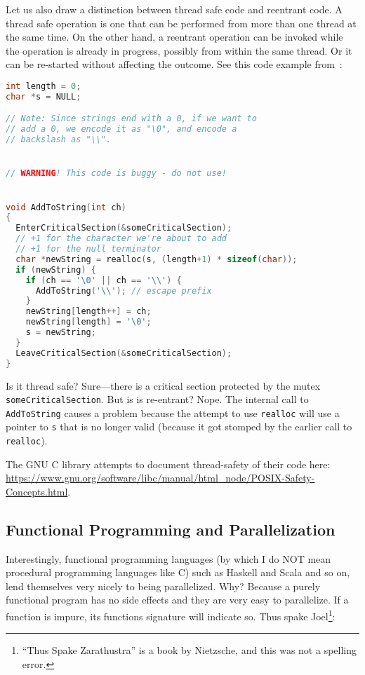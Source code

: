 Let us also draw a distinction between thread safe code and reentrant code. A thread safe operation is one that can be performed from more than one thread at the same time. On the other hand, a reentrant operation can be invoked while the operation is already in progress, possibly from within the same thread. Or it can be re-started without affecting the outcome. See this code example from~\cite{tont:threadsafe}:
\begin{lstlisting}[language=C]
int length = 0;
char *s = NULL;

// Note: Since strings end with a 0, if we want to
// add a 0, we encode it as "\0", and encode a
// backslash as "\\".


// WARNING! This code is buggy - do not use!


void AddToString(int ch)
{
  EnterCriticalSection(&someCriticalSection);
  // +1 for the character we're about to add
  // +1 for the null terminator
  char *newString = realloc(s, (length+1) * sizeof(char));
  if (newString) {
    if (ch == '\0' || ch == '\\') {
      AddToString('\\'); // escape prefix
    }
    newString[length++] = ch;
    newString[length] = '\0';
    s = newString;
  }
  LeaveCriticalSection(&someCriticalSection);
}
\end{lstlisting}

Is it thread safe? Sure---there is a critical section protected by the mutex \texttt{someCriticalSection}. But is is re-entrant? Nope. The internal call to \texttt{AddToString} causes a problem because the attempt to use \texttt{realloc} will use a pointer to \texttt{s} that is no longer valid (because it got stomped by the earlier call to \texttt{realloc}).

The GNU C library attempts to document thread-safety of their code here:
\url{https://www.gnu.org/software/libc/manual/html_node/POSIX-Safety-Concepts.html}.

\subsection*{Functional Programming and Parallelization}
Interestingly, functional programming languages (by which I do NOT mean procedural programming languages like C) such as Haskell and Scala and so on, lend themselves very nicely to being parallelized. Why? Because a purely functional program has no side effects and they are very easy to parallelize. If a function is impure, its functions signature will indicate so. Thus spake Joel\footnote{``Thus Spake Zarathustra'' is a book by Nietzsche, and this was not a spelling error.}:

